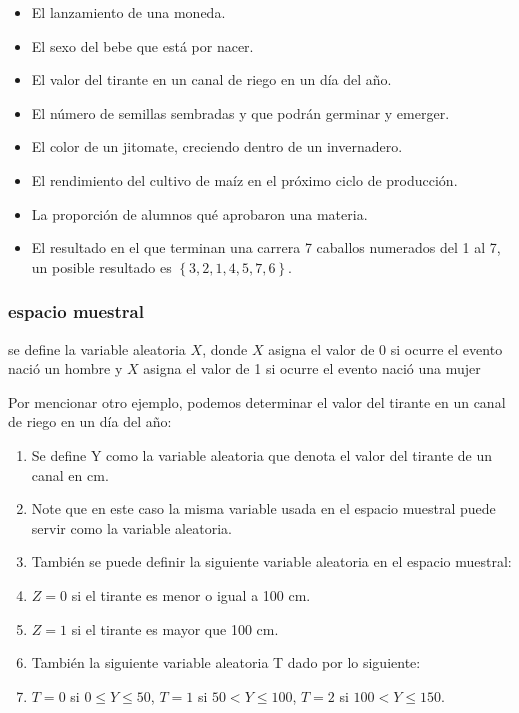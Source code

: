 \begin{itemize}
    \item El lanzamiento de una moneda.
    \item El sexo del bebe que está por nacer.
    \item El valor del tirante en un canal de riego en un día del año.
    \item El número de semillas sembradas y que podrán germinar y emerger.
    \item El color de un jitomate, creciendo dentro de un invernadero.
    \item El rendimiento del cultivo de maíz en el próximo ciclo de producción.
    \item La proporción de alumnos qué aprobaron una materia.
    \item El resultado en el que terminan una carrera 7 caballos numerados
          del 1 al 7, un posible resultado es $\left\{ 3,2,1,4,5,7,6\right\}$.
\end{itemize}

\subsubsection{espacio muestral}

se define la variable aleatoria $X$, donde $X$ asigna el valor de 0 si ocurre el evento nació un hombre y $X$ asigna el valor de 1 si ocurre el evento nació una mujer

Por mencionar otro ejemplo, podemos determinar el valor del tirante en un canal de riego en un día del año:

\begin{enumerate}
    \item Se define Y como la variable aleatoria que denota el valor del tirante
          de un canal en cm.
    \item Note que en este caso la misma variable usada en el espacio
          muestral puede servir como la variable aleatoria.
    \item También se puede definir la siguiente variable aleatoria en el espacio
          muestral:
    \item $Z=0$ si el tirante es menor o igual a 100 cm.
    \item $Z=1$ si el tirante es mayor que 100 cm.
    \item También la siguiente variable aleatoria T dado por lo siguiente:
    \item $T=0$ si $0\leq Y\leq 50$, $T=1$ si $50<Y\leq 100$, $T=2$ si $100<Y\leq 150$.
\end{enumerate}

